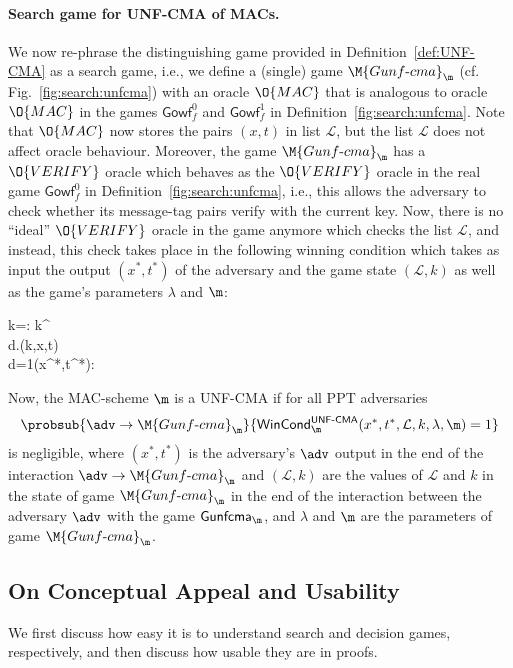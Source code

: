 \paragraph{Search game for UNF-CMA of MACs.} We now re-phrase the distinguishing game provided in Definition~\ref{def:UNF-CMA} as a search game, i.e., we define a (single) game $\M{Gunf\text{-}cma}_\m$ (cf. Fig.~\ref{fig:search:unfcma}) with an oracle $\O{MAC}$ that is analogous to oracle 
$\O{MAC}$ in the games $\textsf{Gowf}_f^0$ and $\textsf{Gowf}_f^1$ in Definition~\ref{fig:search:unfcma}. Note that $\O{MAC}$ now stores the pairs $(x,t)$ in list $\mathcal{L}$, but the list $\mathcal{L}$ does not affect oracle behaviour. Moreover, the game
$\M{Gunf\text{-}cma}_\m$ has a $\O{VERIFY}$ oracle which behaves as the $\O{VERIFY}$ oracle in the real game 
$\textsf{Gowf}_f^0$ in Definition~\ref{fig:search:unfcma}, i.e., this allows the adversary to check whether its message-tag pairs verify with the current key. Now, there is no ``ideal'' $\O{VERIFY}$ oracle in the game anymore which checks the list $\mathcal{L}$, and instead, this check takes place in the following winning condition which takes as input the output $(x^*,t^*)$ of the adversary and the game state $(\mathcal{L},k)$ as well as the game's parameters $\lambda$ and $\m$:
\medskip

\hspace{1cm}
{\pcif k=\bot: k\sample\bin^\lambda\\
d\gets \m.\ver(k,x,t)\\
\pcif d=1(x^*,t^*)\notin{}: \\
\pcelse {}
}

\medskip
\noindent
Now, the MAC-scheme $\m$ is a UNF-CMA if for all PPT adversaries
\[\probsub{\adv\rightarrow\M{Gunf\text{-}cma}_\m}{\mathsf{WinCond}_\m^{\mathsf{UNF\text{-}CMA}}(x^*,t^*,\mathcal{L},k,\lambda,\m)=1}\]
is negligible, where $(x^*,t^*)$ is the adversary's $\adv$ output in the end of the interaction $\adv\rightarrow\M{Gunf\text{-}cma}_\m$ and $(\mathcal{L},k)$ are the values of $\mathcal{L}$ and $k$ in the state of game $\M{Gunf\text{-}cma}_\m$ in the end of the interaction
between the adversary $\adv$ with the game $\mathsf{Gunfcma}_\m$, and $\lambda$ and $\m$ are the parameters of game $\M{Gunf\text{-}cma}_\m$.




\subsection{On Conceptual Appeal and Usability}\label{app:search:usability} We first discuss how easy it is to understand search and decision games, respectively, and then discuss how usable they are in proofs.
